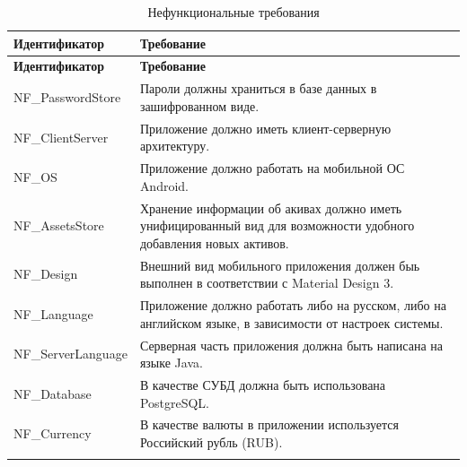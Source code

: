 \documentclass[a4paper, 14pt]{article}
\begin{document}
\begin{longtable}{| p{} | p{} |}
    \hline
    \textbf{Идентификатор} & \textbf{Требование}                                                                                               \\
    \hline
    \endfirsthead
    \hline
    \textbf{Идентификатор} & \textbf{Требование}                                                                                               \\
    \hline
    \endhead


    NF\_PasswordStore      & Пароли должны храниться в базе данных в зашифрованном виде.                                                       \\ \hline
    NF\_ClientServer       & Приложение должно иметь клиент-серверную архитектуру.                                                             \\ \hline
    NF\_OS                 & Приложение должно работать на мобильной ОС Android.                                                               \\ \hline
    NF\_AssetsStore        & Хранение информации об акивах должно иметь унифицированный вид для возможности удобного добавления новых активов. \\ \hline
    NF\_Design             & Внешний вид мобильного приложения должен быь выполнен в соответствии с Material Design 3.                         \\ \hline
    NF\_Language           & Приложение должно работать либо на русском, либо на английском языке, в зависимости от настроек системы.          \\ \hline
    NF\_ServerLanguage     & Серверная часть приложения должна быть написана на языке Java.                                                    \\ \hline
    NF\_Database     & В качестве СУБД должна быть использована PostgreSQL.                                                    \\ \hline
    NF\_Currency     & В качестве валюты в приложении используется Российский рубль (RUB).                                                  \\ \hline
    \caption{Нефункциональные требования}
\end{longtable}
\end{document}
